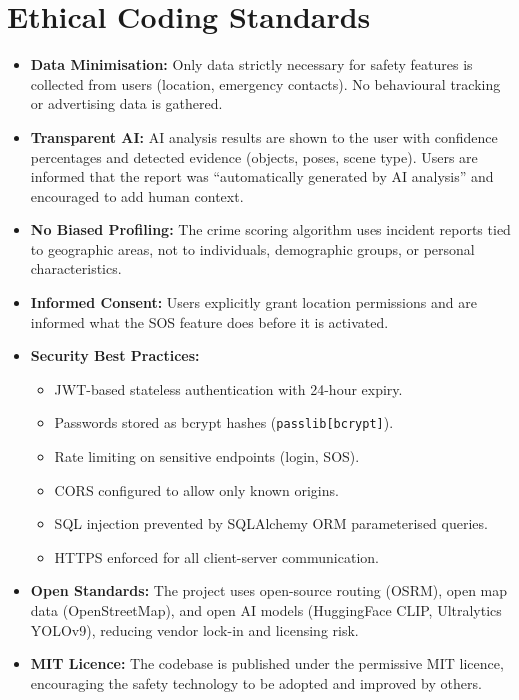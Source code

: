 \documentclass[12pt,a4paper]{report}
\begin{document}
\section{Ethical Coding Standards}
\begin{itemize}[leftmargin=*]
    \item \textbf{Data Minimisation:} Only data strictly necessary for safety features is collected from users (location, emergency contacts). No behavioural tracking or advertising data is gathered.
    \item \textbf{Transparent AI:} AI analysis results are shown to the user with confidence percentages and detected evidence (objects, poses, scene type). Users are informed that the report was ``automatically generated by AI analysis'' and encouraged to add human context.
    \item \textbf{No Biased Profiling:} The crime scoring algorithm uses incident reports tied to geographic areas, not to individuals, demographic groups, or personal characteristics.
    \item \textbf{Informed Consent:} Users explicitly grant location permissions and are informed what the SOS feature does before it is activated.
    \item \textbf{Security Best Practices:}
        \begin{itemize}
            \item JWT-based stateless authentication with 24-hour expiry.
            \item Passwords stored as bcrypt hashes (\texttt{passlib[bcrypt]}).
            \item Rate limiting on sensitive endpoints (login, SOS).
            \item CORS configured to allow only known origins.
            \item SQL injection prevented by SQLAlchemy ORM parameterised queries.
            \item HTTPS enforced for all client-server communication.
        \end{itemize}
    \item \textbf{Open Standards:} The project uses open-source routing (OSRM), open map data (OpenStreetMap), and open AI models (HuggingFace CLIP, Ultralytics YOLOv9), reducing vendor lock-in and licensing risk.
    \item \textbf{MIT Licence:} The codebase is published under the permissive MIT licence, encouraging the safety technology to be adopted and improved by others.
\end{itemize}
\end{document}
